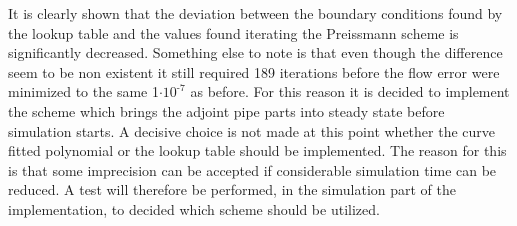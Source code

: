 It is clearly shown that the deviation between the boundary conditions found by the lookup table and the values found iterating the Preissmann scheme is significantly decreased.
Something else to note is that even though the difference seem to be non existent it still required 189 iterations before the flow error were minimized to the same 1$\cdot \text{10}^{\text{-7}}$ as before. For this reason it is decided to implement the scheme which brings the adjoint pipe parts into steady state before simulation starts. A decisive choice is not made at this point whether the curve fitted polynomial or the lookup table should be implemented. The reason for this is that some imprecision can be accepted if considerable simulation time can be reduced. A test will therefore be performed, in the simulation part of the implementation, to decided which scheme should be utilized.


